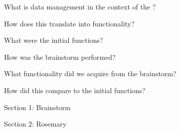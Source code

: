 What is data management in the context of the \ivfsystem{}?

How does this translate into functionality?

What were the initial functions?

How was the brainstorm performed?

What functionality did we acquire from the brainstorm?

How did this compare to the initial functions?


Section 1: Brainstorm

Section 2: Rosemary